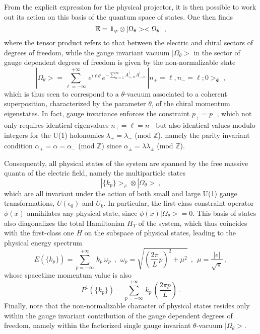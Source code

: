 \documentclass[a4paper,11pt]{article}
\def\one{1\hskip -.37em 1}
\def\proj{\mathbb E}
\def\Z{\mathbb Z}
\begin{document}
From the explicit expression for the physical projector, it is then possible
to work out its action on this basis of the quantum space of states.\cite{Gaby}
One then finds
\begin{equation}
\proj=\one_\varphi\otimes|\Omega_\theta><\Omega_\theta|\ ,
\end{equation}
where the tensor product refers to that between the
electric and chiral sectors of degrees of freedom, while the gauge
invariant vacuum $|\Omega_\theta>$ in the sector of gauge dependent degrees
of freedom is given by the non-normalizable state
\begin{equation}
|\Omega_\theta>=\sum_{\ell=-\infty}^{+\infty}\,e^{i\ell\theta}\,
e^{-\sum_{n=1}^\infty A^\dagger_{+,n}A^\dagger_{-,n}}\,
|n_+=\ell,n_-=\ell;0>_\Phi\ ,
\label{eq:Thetavac}
\end{equation}
which is thus seen to correspond to a $\theta$-vacuum associated to
a coherent superposition, characterized by the parameter
$\theta$, of the chiral momentum eigenstates. In fact, gauge invariance
enforces the constraint $p_+=p_-$, which not only requires identical
eigenvalues $n_+=\ell=n_-$ but also identical values modulo integers for 
the U(1) holonomies $\lambda_+=\lambda_-$ (mod $\Z$), namely the parity 
invariant condition $\alpha_+=\alpha=\alpha_-$ (mod $\Z$) since 
$\alpha_\pm=\lambda\lambda_\pm$ (mod $\Z$).

Consequently, all physical states of the system are spanned by the
free massive quanta of the electric field, namely the multiparticle states
\begin{equation}
|\{k_p\}>_\varphi\otimes|\Omega_\theta>\ ,
\end{equation}
which are all invariant under the action of both small and large U(1) gauge
transformations, $U(\epsilon_0)$ and $U_k$. In particular, the first-class 
constraint ope\-ra\-tor $\phi(x)$ annihilates any physical state, since
$\phi(x)|\Omega_\theta>=0$.
This basis of states also diagonalizes the total Hamiltonian $H_T$ of the
system, which thus coincides with the first-class one $H$ on the subspace
of physical states, leading to the physical energy spectrum
\begin{equation}
E(\{k_p\})=\sum_{p=-\infty}^{+\infty}\,k_p\,\omega_p\ \ ,\ \ 
\omega_p=\sqrt{\left(\frac{2\pi}{L}p\right)^2+\mu^2}\ \ ,\ \ 
\mu=\frac{|e|}{\sqrt{\pi}}\ ,
\end{equation}
whose spacetime momentum value is also
\begin{equation}
P^1(\{k_p\})=\sum_{p=-\infty}^{+\infty}\,k_p\,\left(\frac{2\pi p}{L}\right)\ .
\end{equation}
Finally, note that the non-normalizable character of physical states resides
only within the gauge invariant contribution of the gauge dependent degrees
of freedom, namely within the factorized single gauge invariant
$\theta$-vacuum $|\Omega_\theta>$.
\end{document}
